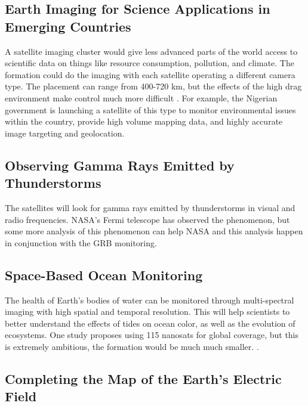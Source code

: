 \subsection{Earth Imaging for Science Applications in Emerging Countries}

A satellite imaging cluster would give less advanced parts of the world access to scientific data on things like resource consumption, pollution, and climate. The formation could do the imaging with each satellite operating a different camera type. The placement can range from 400-720 km, but the effects of the high drag environment make control much more difficult\cite{Ref:Harrison} \cite{Ref:Atir} \cite{Ref:Herscovitz}\cite{Ref:Kalman}\cite{Ref:Kim}. For example, the Nigerian government is launching a satellite of this type to monitor environmental issues within the country, provide high volume mapping data, and highly accurate image targeting and geolocation\cite{Ref:Curiel}. 

\subsection{Observing Gamma Rays Emitted by Thunderstorms}

The satellites will look for gamma rays emitted by thunderstorms in visual and radio frequencies. NASA's Fermi telescope has observed the phenomenon, but some more analysis of this phenomenon can help NASA and this analysis happen in conjunction with the GRB monitoring.\cite{Ref:Fermi} \cite{Ref:Kitts}

\subsection{Space-Based Ocean Monitoring}

The health of Earth's bodies of water can be monitored through multi-spectral imaging with high spatial and temporal resolution. This will help scientists to better understand the effects of tides on ocean color, as well as the evolution of ecosystems. One study proposes using 115 nanosats for global coverage, but this is extremely ambitious, the formation would be much much smaller. \cite{Ref:Lowe}. %

\subsection{Completing the Map of the Earth's Electric Field}

